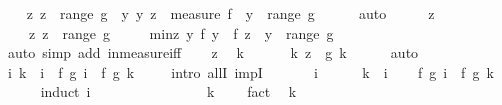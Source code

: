 \begin{isabellebody}
\ \ \isamarkupfalse%
\ {\isachardoublequoteopen}{\isasymexists}z{\isachardot}\ z\ {\isasymin}\ range\ g\ {\isasymand}\ {\isacharparenleft}{\isasymforall}y{\isachardot}\ {\isacharparenleft}y{\isacharcomma}\ z{\isacharparenright}\ {\isasymin}\ measure\ f\ {\isasymlongrightarrow}\ y\ {\isasymnotin}\ range\ g{\isacharparenright}{\isachardoublequoteclose}\isanewline
\ \ \ \ \isamarkupfalse%
\ auto\isanewline
\ \ \isamarkupfalse%
\ \isamarkupfalse%
\ z\ \ \isanewline
\ \ \ \ z{\isacharcolon}\ {\isachardoublequoteopen}z\ {\isasymin}\ range\ g{\isachardoublequoteclose}\ \isanewline
\ \ \ \ min{\isacharunderscore}z{\isacharcolon}\ {\isachardoublequoteopen}{\isasymforall}y{\isachardot}\ f\ y\ {\isacharless}\ f\ z\ {\isasymlongrightarrow}\ y\ {\isasymnotin}\ range\ g{\isachardoublequoteclose}\isanewline
\ \ \ \ \isamarkupfalse%
\ {\isacharparenleft}auto\ simp\ add{\isacharcolon}\ in{\isacharunderscore}measure{\isacharunderscore}iff{\isacharparenright}\isanewline
\ \ \isamarkupfalse%
\ z\ \isamarkupfalse%
\ k\ \ \isanewline
\ \ \ \ k{\isacharcolon}\ {\isachardoublequoteopen}z\ {\isacharequal}\ g\ k{\isachardoublequoteclose}\isanewline
\ \ \ \ \isamarkupfalse%
\ auto\isanewline
\ \ \isamarkupfalse%
\ {\isachardoublequoteopen}{\isasymforall}i{\isachardot}\ k\ {\isasymle}\ i\ {\isasymlongrightarrow}\ f\ {\isacharparenleft}g\ i{\isacharparenright}\ {\isacharequal}\ f\ {\isacharparenleft}g\ k{\isacharparenright}{\isachardoublequoteclose}\ \isanewline
\ \ \isamarkupfalse%
\ {\isacharparenleft}intro\ allI\ impI{\isacharparenright}\ \isanewline
\ \ \ \ \isamarkupfalse%
\ i\isanewline
\ \ \ \ \isamarkupfalse%
\ {\isachardoublequoteopen}k\ {\isasymle}\ i{\isachardoublequoteclose}\ \isamarkupfalse%
\ \isamarkupfalse%
\ {\isachardoublequoteopen}f\ {\isacharparenleft}g\ i{\isacharparenright}\ {\isacharequal}\ f\ {\isacharparenleft}g\ k{\isacharparenright}{\isachardoublequoteclose}\isanewline
\ \ \ \ \isamarkupfalse%
\ {\isacharparenleft}induct\ i{\isacharparenright}\isanewline
\ \ \ \ \ \ \isamarkupfalse%
\ {}\isanewline
\ \ \ \ \ \ \isamarkupfalse%
\ {\isachardoublequoteopen}k\ {\isasymle}\ {}{\isachardoublequoteclose}\ \isamarkupfalse%
\ fact\ \isamarkupfalse%
\ {\isachardoublequoteopen}k\ {\isacharequal}\ {}{\isachardoublequoteclose}\ \isamarkupfalse%

\end{isabellebody}
